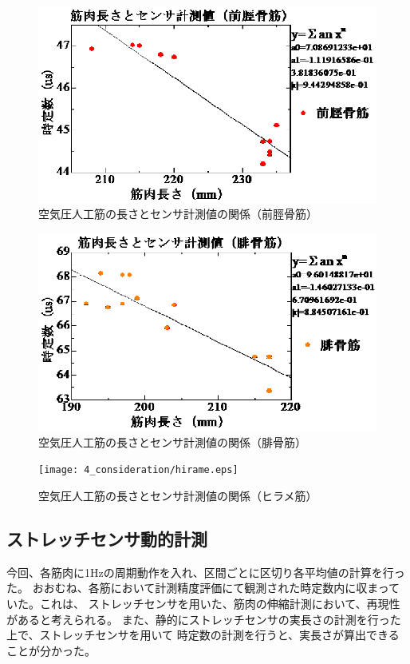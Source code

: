 \begin{figure}[h]
    \begin{center}
        \includegraphics[width=0.7\columnwidth,clip]{4_consideration/zenkei.eps}
    \end{center}
    \caption{空気圧人工筋の長さとセンサ計測値の関係（前脛骨筋）}
    \label{ml-rc1}
\end{figure}
\clearpage
\begin{figure}[h]
    \begin{center}
        \includegraphics[width=0.7\columnwidth,clip]{4_consideration/hikotsu.eps}
    \end{center}
    \caption{空気圧人工筋の長さとセンサ計測値の関係（腓骨筋）}
    \label{ml-rc2}
\end{figure}
\begin{figure}[h]
    \begin{center}
        \texttt{[image: 4\_consideration/hirame.eps]}
    \end{center}
    \caption{空気圧人工筋の長さとセンサ計測値の関係（ヒラメ筋）}
    \label{ml-rc3}
\end{figure}
\clearpage
\subsection{ストレッチセンサ動的計測}
今回、各筋肉に1Hzの周期動作を入れ、区間ごとに区切り各平均値の計算を行った。
おおむね、各筋において計測精度評価にて観測された時定数内に収まっていた。これは、
ストレッチセンサを用いた、筋肉の伸縮計測において、再現性があると考えられる。
また、静的にストレッチセンサの実長さの計測を行った上で、ストレッチセンサを用いて
時定数の計測を行うと、実長さが算出できることが分かった。

